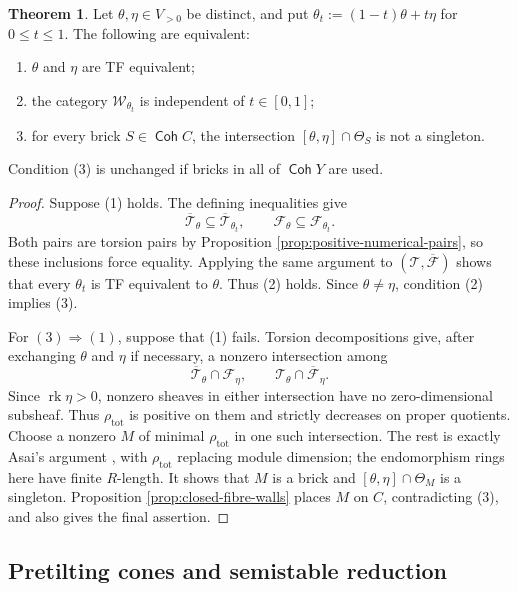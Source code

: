 \documentclass[a4paper,reqno]{amsart}
\def\F{\mathcal{F}}
\def\T{\mathcal{T}}
\def\W{\mathcal{W}}
\DeclareMathOperator{\Coh}{\mathsf{Coh}}
\DeclareMathOperator{\rk}{rk}
\theoremstyle{definition}
\newtheorem{Thm}{Theorem}[section]
\begin{document}
\begin{Thm}\label{thm:tf-brick-walls}
Let $\theta,\eta\in V_{>0}$ be distinct, and put $\theta_t:=(1-t)\theta+t\eta$ for $0\le t\le1$. The following are equivalent:
\begin{enumerate}
\item $\theta$ and $\eta$ are TF equivalent;
\item the category $\W_{\theta_t}$ is independent of $t\in[0,1]$;
\item for every brick $S\in\Coh C$, the intersection $[\theta,\eta]\cap\Theta_S$ is not a singleton.
\end{enumerate}
Condition (3) is unchanged if bricks in all of $\Coh Y$ are used.
\end{Thm}
\begin{proof}
Suppose (1) holds. The defining inequalities give
\[
\overline{\T}_\theta\subseteq\overline{\T}_{\theta_t},
\qquad
\F_\theta\subseteq\F_{\theta_t}.
\]
Both pairs are torsion pairs by Proposition \ref{prop:positive-numerical-pairs}, so these inclusions force equality. Applying the same argument to $(\T,\overline{\F})$ shows that every $\theta_t$ is TF equivalent to $\theta$. Thus (2) holds. Since $\theta\ne\eta$, condition (2) implies (3).

For $(3)\Rightarrow(1)$, suppose that (1) fails. Torsion decompositions give, after exchanging $\theta$ and $\eta$ if necessary, a nonzero intersection among
\begin{equation}\label{eq:tf-crossing-intersections}
\overline{\T}_\theta\cap\F_\eta,
\qquad
\T_\theta\cap\overline{\F}_\eta.
\end{equation}
Since $\rk\eta>0$, nonzero sheaves in either intersection have no zero-dimensional subsheaf. Thus $\rho_{\mathrm{tot}}$ is positive on them and strictly decreases on proper quotients. Choose a nonzero $M$ of minimal $\rho_{\mathrm{tot}}$ in one such intersection. The rest is exactly Asai's argument \cite[proof of Theorem 2.16]{Asa21}, with $\rho_{\mathrm{tot}}$ replacing module dimension; the endomorphism rings here have finite $R$-length. It shows that $M$ is a brick and $[\theta,\eta]\cap\Theta_M$ is a singleton. Proposition \ref{prop:closed-fibre-walls} places $M$ on $C$, contradicting (3), and also gives the final assertion.
\end{proof}

\subsection{Pretilting cones and semistable reduction}
\end{document}
